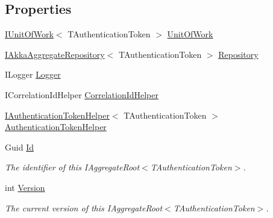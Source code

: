 \subsection*{Properties}
\begin{DoxyCompactItemize}
\item 
\hyperlink{interfaceCqrs_1_1Domain_1_1IUnitOfWork}{I\+Unit\+Of\+Work}$<$ T\+Authentication\+Token $>$ \hyperlink{classCqrs_1_1Akka_1_1Domain_1_1AkkaAggregateRoot_a58b79dc3e0d837e58d95f5cfeb2da9a1_a58b79dc3e0d837e58d95f5cfeb2da9a1}{Unit\+Of\+Work}
\item 
\hyperlink{interfaceCqrs_1_1Akka_1_1Domain_1_1IAkkaAggregateRepository}{I\+Akka\+Aggregate\+Repository}$<$ T\+Authentication\+Token $>$ \hyperlink{classCqrs_1_1Akka_1_1Domain_1_1AkkaAggregateRoot_ae15ae65ca994c5ab932d9817a9f7cb7d_ae15ae65ca994c5ab932d9817a9f7cb7d}{Repository}
\item 
I\+Logger \hyperlink{classCqrs_1_1Akka_1_1Domain_1_1AkkaAggregateRoot_a685737862246db856bf3eb94345fca3f_a685737862246db856bf3eb94345fca3f}{Logger}
\item 
I\+Correlation\+Id\+Helper \hyperlink{classCqrs_1_1Akka_1_1Domain_1_1AkkaAggregateRoot_ae1460c9574d7d7b1cb9de2848ae7102e_ae1460c9574d7d7b1cb9de2848ae7102e}{Correlation\+Id\+Helper}
\item 
\hyperlink{interfaceCqrs_1_1Authentication_1_1IAuthenticationTokenHelper}{I\+Authentication\+Token\+Helper}$<$ T\+Authentication\+Token $>$ \hyperlink{classCqrs_1_1Akka_1_1Domain_1_1AkkaAggregateRoot_a3a73139fe47221bd579949e978d0126d_a3a73139fe47221bd579949e978d0126d}{Authentication\+Token\+Helper}
\item 
Guid \hyperlink{classCqrs_1_1Akka_1_1Domain_1_1AkkaAggregateRoot_ac03d79efc02629b17642c6324ff181c9_ac03d79efc02629b17642c6324ff181c9}{Id}
\begin{DoxyCompactList}\small\item\em The identifier of this I\+Aggregate\+Root$<$\+T\+Authentication\+Token$>$. \end{DoxyCompactList}\item 
int \hyperlink{classCqrs_1_1Akka_1_1Domain_1_1AkkaAggregateRoot_a4b526322c63542b1da2a700ff1b48d0c_a4b526322c63542b1da2a700ff1b48d0c}{Version}
\begin{DoxyCompactList}\small\item\em The current version of this I\+Aggregate\+Root$<$\+T\+Authentication\+Token$>$. \end{DoxyCompactList}\end{DoxyCompactItemize}


